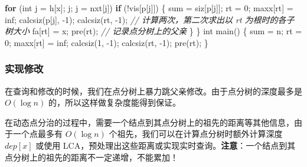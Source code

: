 \documentclass[
]{article}
\newenvironment{Shaded}{}{}
\newcommand{\CommentTok}[1]{\textcolor[rgb]{0.38,0.63,0.69}{\textit{#1}}}
\newcommand{\ControlFlowTok}[1]{\textcolor[rgb]{0.00,0.44,0.13}{\textbf{#1}}}
\newcommand{\DataTypeTok}[1]{\textcolor[rgb]{0.56,0.13,0.00}{#1}}
\newcommand{\DecValTok}[1]{\textcolor[rgb]{0.25,0.63,0.44}{#1}}
\newcommand{\NormalTok}[1]{#1}
\newcommand{\OperatorTok}[1]{\textcolor[rgb]{0.40,0.40,0.40}{#1}}
\begin{document}
\begin{Shaded}
\begin{Highlighting}[]
  \ControlFlowTok{for} \OperatorTok{(}\DataTypeTok{int}\NormalTok{ j }\OperatorTok{=}\NormalTok{ h}\OperatorTok{[}\NormalTok{x}\OperatorTok{];}\NormalTok{ j}\OperatorTok{;}\NormalTok{ j }\OperatorTok{=}\NormalTok{ nxt}\OperatorTok{[}\NormalTok{j}\OperatorTok{])}
    \ControlFlowTok{if} \OperatorTok{(!}\NormalTok{vis}\OperatorTok{[}\NormalTok{p}\OperatorTok{[}\NormalTok{j}\OperatorTok{]])} \OperatorTok{\{}
\NormalTok{      sum }\OperatorTok{=}\NormalTok{ siz}\OperatorTok{[}\NormalTok{p}\OperatorTok{[}\NormalTok{j}\OperatorTok{]];}
\NormalTok{      rt }\OperatorTok{=} \DecValTok{0}\OperatorTok{;}
\NormalTok{      maxx}\OperatorTok{[}\NormalTok{rt}\OperatorTok{]} \OperatorTok{=}\NormalTok{ inf}\OperatorTok{;}
\NormalTok{      calcsiz}\OperatorTok{(}\NormalTok{p}\OperatorTok{[}\NormalTok{j}\OperatorTok{],} \OperatorTok{{-}}\DecValTok{1}\OperatorTok{);}
\NormalTok{      calcsiz}\OperatorTok{(}\NormalTok{rt}\OperatorTok{,} \OperatorTok{{-}}\DecValTok{1}\OperatorTok{);}  \CommentTok{// 计算两次，第二次求出以 rt 为根时的各子树大小}
\NormalTok{      fa}\OperatorTok{[}\NormalTok{rt}\OperatorTok{]} \OperatorTok{=}\NormalTok{ x}\OperatorTok{;}
\NormalTok{      pre}\OperatorTok{(}\NormalTok{rt}\OperatorTok{);}  \CommentTok{// 记录点分树上的父亲}
    \OperatorTok{\}}
\OperatorTok{\}}
\DataTypeTok{int}\NormalTok{ main}\OperatorTok{()} \OperatorTok{\{}
\NormalTok{  sum }\OperatorTok{=}\NormalTok{ n}\OperatorTok{;}
\NormalTok{  rt }\OperatorTok{=} \DecValTok{0}\OperatorTok{;}
\NormalTok{  maxx}\OperatorTok{[}\NormalTok{rt}\OperatorTok{]} \OperatorTok{=}\NormalTok{ inf}\OperatorTok{;}
\NormalTok{  calcsiz}\OperatorTok{(}\DecValTok{1}\OperatorTok{,} \OperatorTok{{-}}\DecValTok{1}\OperatorTok{);}
\NormalTok{  calcsiz}\OperatorTok{(}\NormalTok{rt}\OperatorTok{,} \OperatorTok{{-}}\DecValTok{1}\OperatorTok{);}
\NormalTok{  pre}\OperatorTok{(}\NormalTok{rt}\OperatorTok{);}
\OperatorTok{\}}
\end{Highlighting}
\end{Shaded}

\hypertarget{ux5b9eux73b0ux4feeux6539}{%
\subsubsection{实现修改}\label{ux5b9eux73b0ux4feeux6539}}

在查询和修改的时候，我们在点分树上暴力跳父亲修改。由于点分树的深度最多是
\(O(\log n)\) 的，所以这样做复杂度能得到保证。

在动态点分治的过程中，需要一个结点到其点分树上的祖先的距离等其他信息，由于一个点最多有
\(O(\log n)\) 个祖先，我们可以在计算点分树时额外计算深度 \(dep[x]\)
或使用
LCA，预处理出这些距离或实现实时查询。\textbf{注意}：一个结点到其点分树上的祖先的距离不一定递增，不能累加！
\end{document}

